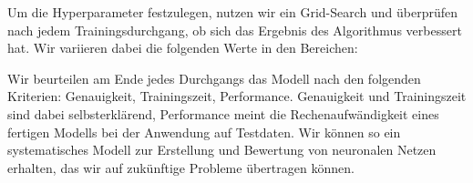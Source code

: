 Um die Hyperparameter festzulegen, nutzen wir ein Grid-Search und überprüfen nach jedem Trainingsdurchgang, ob sich das Ergebnis des Algorithmus verbessert hat. Wir variieren dabei die folgenden Werte in den Bereichen:

Wir beurteilen am Ende jedes Durchgangs das Modell nach den folgenden Kriterien: Genauigkeit, Trainingszeit, Performance. Genauigkeit und Trainingszeit sind dabei selbsterklärend, Performance meint die Rechenaufwändigkeit eines fertigen Modells bei der Anwendung auf Testdaten. Wir können so ein systematisches Modell zur Erstellung und Bewertung von neuronalen Netzen erhalten, das wir auf zukünftige Probleme übertragen können.

